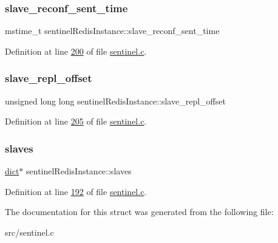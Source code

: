 \subsubsection{\texorpdfstring{slave\+\_\+reconf\+\_\+sent\+\_\+time}{slave\_reconf\_sent\_time}}
{\footnotesize\ttfamily mstime\+\_\+t sentinel\+Redis\+Instance\+::slave\+\_\+reconf\+\_\+sent\+\_\+time}



Definition at line \hyperlink{sentinel_8c_source_l00200}{200} of file \hyperlink{sentinel_8c_source}{sentinel.\+c}.

\mbox{\label{structsentinelRedisInstance_a882b6ade65eca5be6dacb6a2166c5e5a}} 
\subsubsection{\texorpdfstring{slave\+\_\+repl\+\_\+offset}{slave\_repl\_offset}}
{\footnotesize\ttfamily unsigned long long sentinel\+Redis\+Instance\+::slave\+\_\+repl\+\_\+offset}



Definition at line \hyperlink{sentinel_8c_source_l00205}{205} of file \hyperlink{sentinel_8c_source}{sentinel.\+c}.

\mbox{\label{structsentinelRedisInstance_a21ce6460e98c0ce0db9dbb9a62f4e097}} 
\subsubsection{\texorpdfstring{slaves}{slaves}}
{\footnotesize\ttfamily \hyperlink{structdict}{dict}$\ast$ sentinel\+Redis\+Instance\+::slaves}



Definition at line \hyperlink{sentinel_8c_source_l00192}{192} of file \hyperlink{sentinel_8c_source}{sentinel.\+c}.



The documentation for this struct was generated from the following file\+:\begin{DoxyCompactItemize}
\item 
src/sentinel.\+c\end{DoxyCompactItemize}
